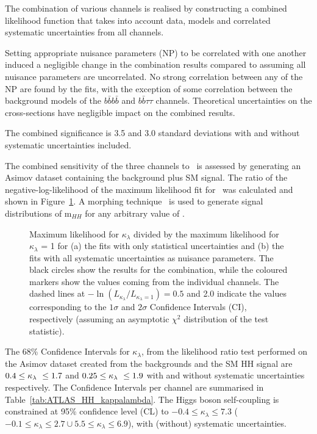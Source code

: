 The combination of various channels is realised by constructing a combined likelihood function that takes into account data, models and correlated systematic uncertainties from all channels. 

Setting appropriate nuisance parameters (NP) to be correlated with one another induced a negligible change in the combination results compared to assuming all nuisance parameters are uncorrelated. No strong correlation between any of the NP are found by the fits, with the exception of some correlation between the background models of the $b\bar{b}b\bar{b}$ and $b\bar{b}\tau\tau$ channels. Theoretical uncertainties on the cross-sections have negligible impact on the combined results.

The combined significance is 3.5 and 3.0 standard deviations with and without systematic uncertainties included.

The combined sensitivity of the three channels to \kl\ is assessed by generating an Asimov dataset containing the background plus SM signal. The ratio of the negative-log-likelihood of the maximum likelihood fit for \kl\ was calculated and shown in Figure~\ref{fig:ATLAS_HH_comb}. A morphing technique~\cite{ATL-PHYS-PUB-2015-047} is used to generate signal distributions of m$_{HH}$ for any arbitrary value of \kl.

\begin{figure}[!htb]
\centering 
{} 
\caption{Maximum likelihood for $\kappa_{\lambda}$ divided by the maximum likelihood for $\kappa_{\lambda}$ = 1 for (a) the fits with only statistical uncertainties and (b) the fits with all systematic uncertainties as nuisance parameters. The black circles show the results for the combination, while the coloured markers show the values coming from the individual channels. The dashed lines at $-\ln\left(L_{\kappa_{\lambda}}/L_{\kappa_{\lambda}=1}\right) = 0.5$ and 2.0 indicate the values corresponding to the $1\sigma$ and $2\sigma$ Confidence Intervals (CI), respectively (assuming an asymptotic $\chi^2$ distribution of the test statistic).} 
\label{fig:ATLAS_HH_comb} 
\end{figure}

The 68\% Confidence Intervals for $\kappa_{\lambda}$, from the likelihood ratio test performed on the Asimov dataset created from the backgrounds and the SM HH signal are $0.4 \leq \kappa_{\lambda}\ \leq 1.7$ and $0.25 \leq \kappa_{\lambda}\ \leq 1.9$ with and without systematic uncertainties respectively. The Confidence Intervals per channel are summarised in Table~\ref{tab:ATLAS_HH_kappalambda}. 
The Higgs boson self-coupling is constrained at 95\% confidence level (CL) to $-0.4\leq \kappa_{\lambda} \leq7.3$ ($-0.1\leq \kappa_{\lambda} \leq2.7\cup5.5\leq \kappa_{\lambda} \leq6.9$), with (without) systematic uncertainties.


